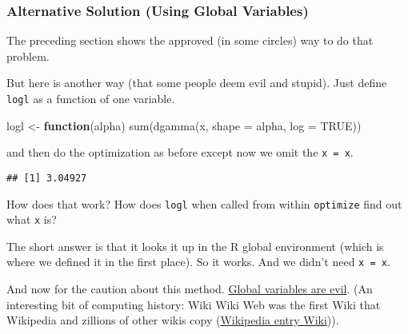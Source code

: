 \documentclass[
]{article}
\newenvironment{Shaded}{\begin{snugshade}}{\end{snugshade}}
\newcommand{\AttributeTok}[1]{\textcolor[rgb]{0.77,0.63,0.00}{#1}}
\newcommand{\ConstantTok}[1]{\textcolor[rgb]{0.00,0.00,0.00}{#1}}
\newcommand{\ControlFlowTok}[1]{\textcolor[rgb]{0.13,0.29,0.53}{\textbf{#1}}}
\newcommand{\FunctionTok}[1]{\textcolor[rgb]{0.00,0.00,0.00}{#1}}
\newcommand{\NormalTok}[1]{#1}
\newcommand{\OtherTok}[1]{\textcolor[rgb]{0.56,0.35,0.01}{#1}}
\newcommand{\SpecialCharTok}[1]{\textcolor[rgb]{0.00,0.00,0.00}{#1}}
\begin{document}
\hypertarget{alternative-solution-using-global-variables}{%
\subsubsection{Alternative Solution (Using Global
Variables)}\label{alternative-solution-using-global-variables}}

The preceding section shows the approved (in some circles) way to do
that problem.

But here is another way (that some people deem evil and stupid). Just
define \texttt{logl} as a function of one variable.

\begin{Shaded}
\begin{Highlighting}[]
\NormalTok{logl }\OtherTok{\textless{}{-}} \ControlFlowTok{function}\NormalTok{(alpha)}
    \FunctionTok{sum}\NormalTok{(}\FunctionTok{dgamma}\NormalTok{(x, }\AttributeTok{shape =}\NormalTok{ alpha, }\AttributeTok{log =} \ConstantTok{TRUE}\NormalTok{))}
\end{Highlighting}
\end{Shaded}

and then do the optimization as before except now we omit the
\texttt{x\ =\ x}.

\begin{Shaded}
\end{Shaded}

\begin{verbatim}
## [1] 3.04927
\end{verbatim}

How does that work? How does \texttt{logl} when called from within
\texttt{optimize} find out what \texttt{x} is?

The short answer is that it looks it up in the R global environment
(which is where we defined it in the first place). So it works. And we
didn't need \texttt{x\ =\ x}.

And now for the caution about this method.
\href{http://wiki.c2.com/?GlobalVariablesAreBad}{Global variables are
evil}. (An interesting bit of computing history: Wiki Wiki Web was the
first Wiki that Wikipedia and zillions of other wikis copy
(\href{https://en.wikipedia.org/w/index.php?title=Wiki\&oldid=752613214}{Wikipedia
entry Wiki})).
\end{document}
